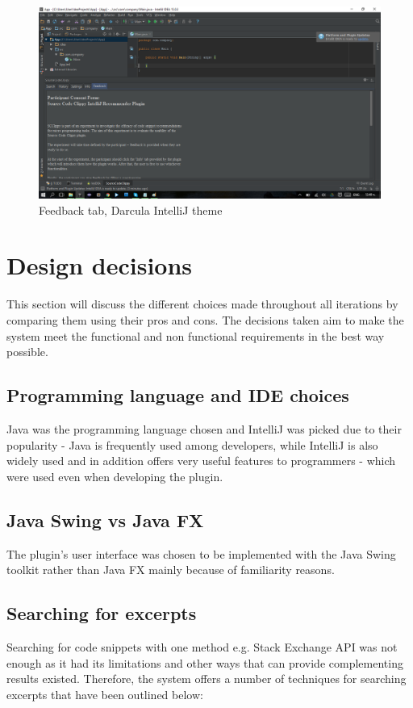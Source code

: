 \documentclass{l4proj}
\begin{document}
\begin{figure}[H]
\includegraphics[scale=0.4]{tab-feedback}
\centering
\caption{Feedback tab, Darcula IntelliJ theme}
\label{fig:feedback-tab}
\end{figure}

\section{Design decisions}

This section will discuss the different choices made throughout all iterations by comparing them using their pros and cons. The decisions taken aim to make the system meet the functional and non functional requirements in the best way possible. 

\subsection{Programming language and IDE choices}
Java was the programming language chosen and IntelliJ was picked due to their popularity - Java is frequently used among developers, while IntelliJ is also widely used and in addition offers very useful features to programmers - which were used even when developing the plugin.

\subsection{Java Swing vs Java FX}
The plugin's user interface was chosen to be implemented with the Java Swing toolkit rather than Java FX mainly because of familiarity reasons.

\subsection{Searching for excerpts}
Searching for code snippets with one method e.g. Stack Exchange API was not enough as it had its limitations and other ways that can provide complementing results existed. Therefore, the system offers a number of techniques for searching excerpts that have been outlined below:
\end{document}
